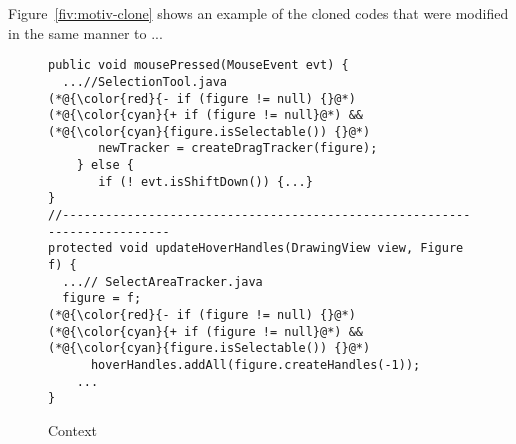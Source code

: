 Figure~\ref{fiv:motiv-clone} shows an example of the cloned codes
that were modified in the same manner to ...

\begin{figure}[t]
	\centering
	\begin{lstlisting}[]
public void mousePressed(MouseEvent evt) { 
  ...//SelectionTool.java
(*@{\color{red}{- if (figure != null) {}@*)
(*@{\color{cyan}{+ if (figure != null}@*) && (*@{\color{cyan}{figure.isSelectable()) {}@*)
       newTracker = createDragTracker(figure);
    } else {
       if (! evt.isShiftDown()) {...}
}
//--------------------------------------------------------------------------
protected void updateHoverHandles(DrawingView view, Figure f) {
  ...// SelectAreaTracker.java
  figure = f;
(*@{\color{red}{- if (figure != null) {}@*)
(*@{\color{cyan}{+ if (figure != null}@*) && (*@{\color{cyan}{figure.isSelectable()) {}@*)
      hoverHandles.addAll(figure.createHandles(-1));
    ...
}
	\end{lstlisting}
        \vspace{-15pt}
        \caption{Context}
        \vspace{-6pt}
        \label{fig:motiv-context}
\end{figure}



